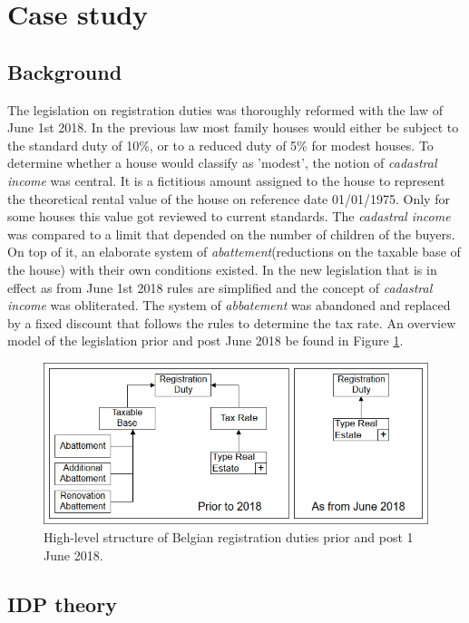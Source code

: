 \section{Case study}
\subsection{Background}
\label{sec:background}
The legislation on registration duties was thoroughly reformed with the law of June 1st 2018. %
In the previous law most family houses would either be subject to the standard duty of 10\%, or to a reduced duty of 5\% for modest houses. 
To determine whether a house would classify as 'modest', the notion of \textit{cadastral income} was central.
It is a fictitious amount assigned to the house to represent the theoretical rental value of the house on reference date 01/01/1975.
Only for some houses this value got reviewed to current standards.
The \textit{cadastral income} was compared to a limit that depended on the number of children of the buyers.
On top of it, an elaborate system of \textit{abattement}(reductions on the taxable base of the house) with their own conditions existed.
In the new legislation that is in effect as from June 1st 2018 rules are simplified and the concept of \textit{cadastral income} was obliterated.
The system of \textit{abbatement} was abandoned and replaced by a fixed discount that follows the rules to determine the tax rate.
An overview model of the legislation prior and post June 2018 be found in Figure \ref{fig:DRD}.

\begin{figure}[h]
    \includegraphics[angle=0,width = 0.8\linewidth]{img/A.png}
  	\caption{High-level structure of Belgian registration duties prior and post 1 June 2018.}
	\label{fig:DRD}
\end{figure}


\subsection{IDP theory}
